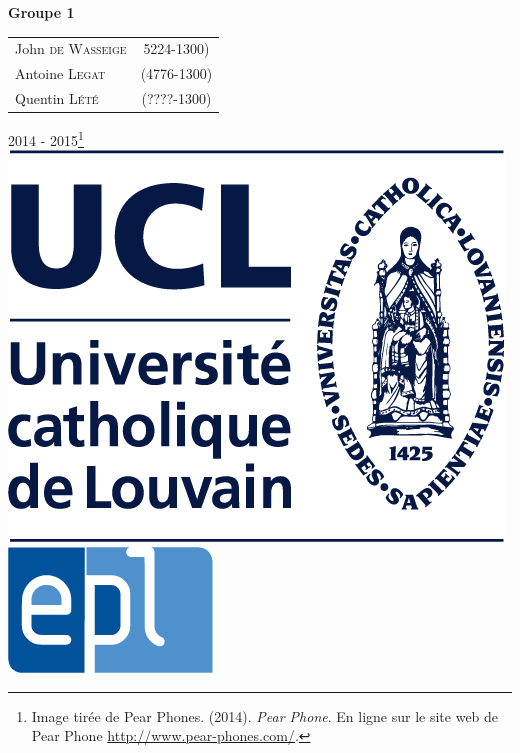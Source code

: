 \begin{titlepage}
	{ \Large
	\begin{center}
	\textbf{Groupe 1}
	\end{center}
	}
	
		
	\vspace{0.2cm}	
	
      \begin{tabular}{lc}
     John \textsc{de Wasseige} & 5224-1300) \\
	Antoine \textsc{Legat} & (4776-1300) \\
	Quentin \textsc{Lété} & (????-1300) \\
      \end{tabular}
      
      \vfill
      





\vfill
{\normalsize 2014 - 2015\footnote{Image tirée de Pear Phones. (2014). \textit{Pear Phone}. En ligne sur le site web de Pear Phone \url{http://www.pear-phones.com/}.}}\\

  \includegraphics[height = 0.07\textheight]{img/ucl.png} \hfill
  \includegraphics[height = 0.07\textheight]{img/epl.jpg}

\end{titlepage}